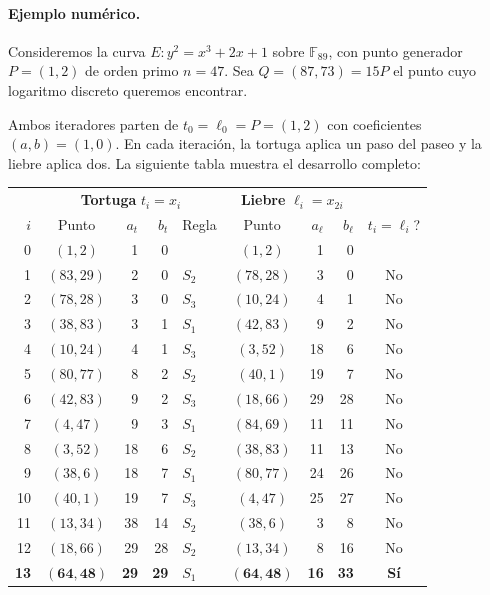 \paragraph{Ejemplo numérico.}
Consideremos la curva $E\colon y^2 = x^3 + 2x + 1$ sobre $\mathbb{F}_{89}$, con punto generador $P = (1, 2)$ de orden primo $n = 47$. Sea $Q = (87, 73) = 15P$ el punto cuyo logaritmo discreto queremos encontrar.

Ambos iteradores parten de $t_0 = \ell_0 = P = (1,2)$ con coeficientes $(a, b) = (1, 0)$. En cada iteración, la tortuga aplica un paso del paseo y la liebre aplica dos. La siguiente tabla muestra el desarrollo completo:

\begin{center}
\begin{small}
\begin{tabular}{r|crrp{0.8cm}|crr|c}
\hline
 & \multicolumn{4}{c|}{\textbf{Tortuga} $t_i = x_i$} & \multicolumn{3}{c|}{\textbf{Liebre} $\ell_i = x_{2i}$} & \\
$i$ & Punto & $a_t$ & $b_t$ & Regla & Punto & $a_\ell$ & $b_\ell$ & $t_i\!=\!\ell_i$? \\
\hline
 0 & $(1, 2)$    &  1 &  0 & & $(1, 2)$    &  1 &  0 &  \\
 1 & $(83, 29)$  &  2 &  0 & $S_2$ & $(78, 28)$  &  3 &  0 & No \\
 2 & $(78, 28)$  &  3 &  0 & $S_3$ & $(10, 24)$  &  4 &  1 & No \\
 3 & $(38, 83)$  &  3 &  1 & $S_1$ & $(42, 83)$  &  9 &  2 & No \\
 4 & $(10, 24)$  &  4 &  1 & $S_3$ & $(3, 52)$   & 18 &  6 & No \\
 5 & $(80, 77)$  &  8 &  2 & $S_2$ & $(40, 1)$   & 19 &  7 & No \\
 6 & $(42, 83)$  &  9 &  2 & $S_3$ & $(18, 66)$  & 29 & 28 & No \\
 7 & $(4, 47)$   &  9 &  3 & $S_1$ & $(84, 69)$  & 11 & 11 & No \\
 8 & $(3, 52)$   & 18 &  6 & $S_2$ & $(38, 83)$  & 11 & 13 & No \\
 9 & $(38, 6)$   & 18 &  7 & $S_1$ & $(80, 77)$  & 24 & 26 & No \\
10 & $(40, 1)$   & 19 &  7 & $S_3$ & $(4, 47)$   & 25 & 27 & No \\
11 & $(13, 34)$  & 38 & 14 & $S_2$ & $(38, 6)$   &  3 &  8 & No \\
12 & $(18, 66)$  & 29 & 28 & $S_2$ & $(13, 34)$  &  8 & 16 & No \\
\textbf{13} & $\mathbf{(64, 48)}$ & \textbf{29} & \textbf{29} & $S_1$ & $\mathbf{(64, 48)}$ & \textbf{16} & \textbf{33} & \textbf{Sí} \\
\hline
\end{tabular}
\end{small}
\end{center}

